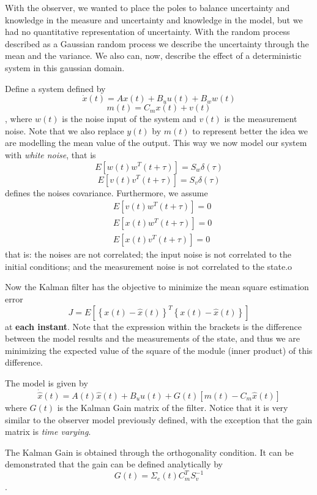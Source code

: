 
With the observer, we wanted to place the poles to balance uncertainty and knowledge in the measure and uncertainty and knowledge in the model, but we had no quantitative representation of uncertainty. With the random process described as a Gaussian random process we describe the uncertainty through the mean and the variance. We also can, now, describe the effect of a deterministic system in this gaussian domain.

Define a system defined by \[
    \dot{x}(t)=Ax(t) + B_uu(t) + B_ww(t)
\] \[
m(t) = C_mx(t) + v(t)
\], where $w(t)$ is the noise input of the system and $v(t)$ is the measurement noise. Note that we also replace $y(t)$ by $m(t)$ to represent better the idea we are modelling the mean value of the output. This way we now model our system with \emph{white noise}, that is \[
E\left[ w(t)w^{T}(t+\tau) \right] = S_w\delta(\tau)
\] \[
E\left[ v(t)v^{T}(t+\tau) \right] = S_v\delta(\tau)
\] defines the noises covariance. Furthermore, we assume 
\begin{equation*}
    \begin{split}
& E\left[ v(t)w^{T}(t+\tau) \right] = 0 \\
& E\left[ x(t)w^{T}(t+\tau) \right] = 0 \\
& E\left[ x(t)v^{T}(t+\tau) \right] = 0
    \end{split}
\end{equation*}
that is: the noises are not correlated; the input noise is not correlated to the initial conditions; and the measurement noise is not correlated to the state.o

Now  the Kalman filter has the objective to minimize the mean square estimation error \[
    J=E\left[ \left\{ x(t)-\hat{x}(t) \right\}^{T}\left\{ x(t)-\hat{x}(t) \right\}   \right] 
\] at \textbf{each instant}. Note that the expression within the brackets is the difference between the model results and the measurements of the state, and thus we are minimizing the expected value of the square of the module (inner product) of this difference.

The model is given by \[
    \dot{\hat{x}}(t)=A(t)\hat{x}(t)+B_uu(t) +G(t)\left[ m(t)-C_m\hat{x}(t) \right] 
\] where $G(t)$ is the Kalman Gain matrix of the filter. Notice that it is very similar to the observer model previously defined, with the exception that the gain matrix is \emph{time varying}.

The Kalman Gain is obtained through the orthogonality condition. It can be demonstrated that the gain can be defined analytically by \[
G(t)=\Sigma_e(t)C_m^{T}S_v^{-1}
\] .

